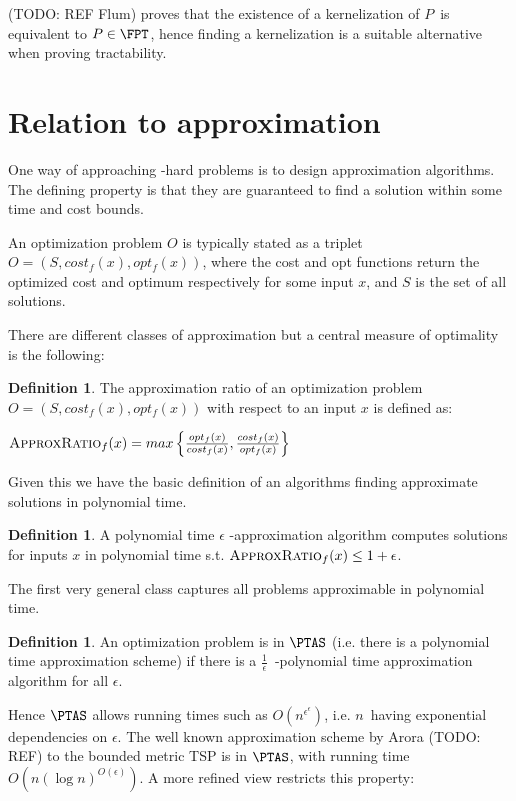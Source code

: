 \documentclass[a4paper,11pt]{report}
\theoremstyle{plain}
\theoremstyle{definition}
\newtheorem{defn}[thm]{Definition} %
\begin{document}
(TODO: REF Flum) proves that the existence of a kernelization of $P$ is equivalent to $P \in \FPT$, hence finding a kernelization is a suitable alternative when proving tractability.

\section{Relation to approximation}
One way of approaching \NP-hard problems is to design approximation algorithms.
The defining property is that they are guaranteed to find a solution within some time and cost bounds.

An optimization problem $O$ is typically stated as a triplet $O = (S, cost_f(x), opt_f(x))$,
where the cost and opt functions return the optimized cost and optimum respectively for some input $x$, and $S$ is the set of all solutions.

There are different classes of approximation but a central measure of optimality is the following:

\begin{defn}
The approximation ratio of an optimization problem $O = (S, cost_f(x), opt_f(x))$ with respect to an input $x$ is defined as:

$\textsc{ApproxRatio}_f(x) = max \left\{ \frac{opt_f(x)}{cost_f(x)}, \frac{cost_f(x)}{opt_f(x)} \right\}$
\end{defn}

Given this we have the basic definition of an algorithms finding approximate solutions in polynomial time.

\begin{defn}
A polynomial time $\epsilon$ -approximation algorithm computes solutions for inputs $x$ in polynomial time s.t. $\textsc{ApproxRatio}_f(x) \leq 1 + \epsilon$.
\end{defn}

The first very general class captures all problems approximable in polynomial time.

\begin{defn}
An optimization problem is in $\PTAS$ (i.e. there is a polynomial time approximation scheme) if there is a $\frac{1}{\epsilon}$ -polynomial time approximation algorithm for all $\epsilon$.
\end{defn}

Hence $\PTAS$ allows running times such as $O(n^{\epsilon ^ \epsilon})$, i.e. $n$ having exponential dependencies on $\epsilon$.
The well known approximation scheme by Arora (TODO: REF) to the bounded metric TSP is in $\PTAS$, with running time $O(n(\log n)^{O(\epsilon)})$.
A more refined view restricts this property:
\end{document}
